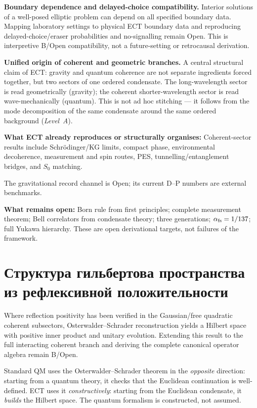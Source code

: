 \documentclass[11pt,a4paper]{article}
\begin{document}
\textbf{Boundary dependence and delayed-choice compatibility.} Interior solutions of a well-posed elliptic problem can depend on all specified boundary data. Mapping laboratory settings to physical ECT boundary data and reproducing delayed-choice/eraser probabilities and no-signalling remain Open. This is interpretive B/Open compatibility, not a future-setting or retrocausal derivation.

\textbf{Unified origin of coherent and geometric branches.} A central structural claim of ECT: gravity and quantum coherence are not separate ingredients forced together, but two sectors of one ordered condensate. The long-wavelength sector is read geometrically (gravity); the coherent shorter-wavelength sector is read wave-mechanically (quantum). This is not ad hoc stitching --- it follows from the mode decomposition of the same condensate around the same ordered background (\emph{Level~A}).

\begin{sloppypar}
\textbf{What ECT already reproduces or structurally organises:} Coherent-sector results include Schr\"odinger/KG limits, compact phase, environmental decoherence, measurement and spin routes, PES, tunnelling/entanglement bridges, and $S_0$ matching.

The gravitational record channel is Open; its current D--P numbers are external benchmarks.
\end{sloppypar}

\textbf{What remains open:} Born rule from first principles; complete measurement theorem; Bell correlators from condensate theory; three generations; $\alpha_{\rm fs} = 1/137$; full Yukawa hierarchy. These are open derivational targets, not failures of the framework.


\section{Структура гильбертова пространства из рефлексивной положительности}

Where reflection positivity has been verified in the Gaussian/free quadratic coherent subsectors, Osterwalder--Schrader reconstruction yields a Hilbert space with positive inner product and unitary evolution. Extending this result to the full interacting coherent branch and deriving the complete canonical operator algebra remain B/Open.

Standard QM uses the Osterwalder--Schrader theorem in the \emph{opposite} direction: starting from a quantum theory, it checks that the Euclidean continuation is well-defined. ECT uses it \emph{constructively}: starting from the Euclidean condensate, it \emph{builds} the Hilbert space. The quantum formalism is constructed, not assumed.
\end{document}
